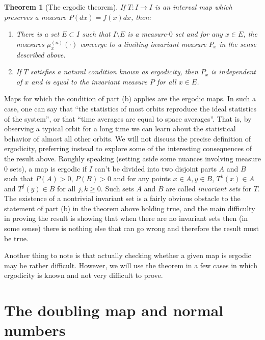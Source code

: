 \documentclass[11pt]{report}
\theoremstyle{plain}
\newtheorem{thm}{Theorem}[chapter]
\theoremstyle{definition}
\begin{document}
\begin{thm}[The ergodic theorem]
If $T:I\to I$ is an interval map which preserves a
measure $P(dx)=f(x)dx$, then:

\begin{enumerate}[label=\arabic*.]
\item There is a set $E\subset I$ such that $I\setminus E$
is a measure-$0$ set and for any $x\in E$, the
measures $\mu_x^{(n)}(\cdot)$ converge to a limiting
invariant measure $P_x$ in the sense described above.

\item If $T$ satisfies a natural condition known as
ergodicity, then $P_x$ is independent of $x$ and is
equal to the invariant measure $P$ for all $x\in E$.
\end{enumerate}

\end{thm}

\noindent Maps for which the condition of part (b) applies are
the ergodic maps. In such a case, one can say that
``the statistics of most orbits reproduce the ideal
statistics of the system'', or that ``time averages
are equal to space averages''. That is, by observing a
typical orbit for a long time we can learn about the
statistical behavior of almost all other orbits. We
will not discuss the precise definition of ergodicity,
preferring instead to explore some of the interesting
consequences of the result above. Roughly speaking
(setting aside some nuances involving measure 0 sets),
a map is ergodic if $I$ can't be divided into two
disjoint parts $A$ and $B$ such that $P(A)>0$,
$P(B)>0$ and for any points $x\in A, y\in B$,
$T^k(x)\in A$ and $T^j(y) \in B$ for all $j,k\ge 0$.
Such sets $A$ and $B$ are called \emph{invariant sets} for
$T$. The existence of a nontrivial invariant set is a
fairly obvious obstacle to the statement of part (b)
in the theorem above holding true, and the main
difficulty in proving the result is showing that when
there are no invariant sets then (in some sense) there
is nothing else that can go wrong and therefore the
result must be true.

Another thing to note is that actually checking
whether a given map is ergodic may be rather
difficult. However, we will use the theorem in a few
cases in which ergodicity is known and not very
difficult to prove.

\section{The doubling map and normal numbers}
\label{sec:normalnumbers}
\end{document}
